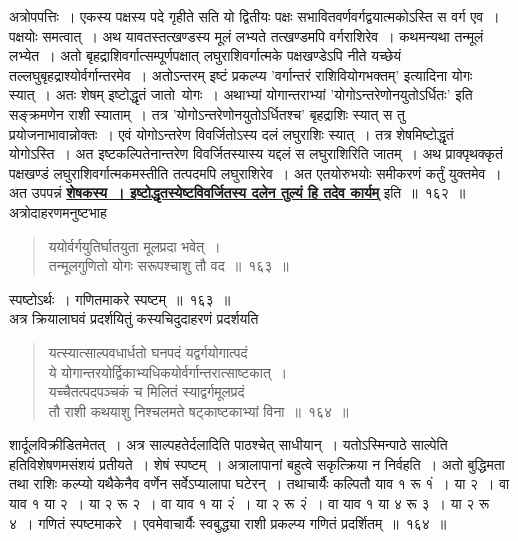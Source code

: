 \documentclass[11pt, openany]{book}
\begin{document}
 अत्रोपपत्तिः~। एकस्य पक्षस्य पदे गृहीते सति यो द्वितीयः पक्षः
सभावितवर्णवर्गद्वयात्मकोऽस्ति स वर्ग एव~। पक्षयोः समत्वात्~। अथ
यावतस्तत्खण्डस्य मूलं लभ्यते तत्खण्डमपि वर्गराशिरेव~। कथमन्यथा तन्मूलं लभ्येत~। अतो बृहद्राशिवर्गात्सम्पूर्णपक्षात् लघुराशिवर्गात्मके पक्षखण्डेऽपि नीते
यच्छेयं तल्लघुबृहद्राश्योर्वर्गान्तरमेव~। अतोऽन्तरम् इष्टं प्रकल्प्य {\qt 'वर्गान्तरं राशिवियोगभक्तम्'} इत्यादिना योगः स्यात्~। अतः शेषम् इष्टोद्धृतं जातो~योगः~। अथाभ्यां योगान्तराभ्यां {\qt 'योगोऽन्तरेणोनयुतोऽर्धितः'} इति सङ्क्रमणेन राशी स्याताम्~। तत्र {\qt 'योगोऽन्तरेणोनयुतोऽर्धितश्च'} बृहद्राशिः स्यात् स तु प्रयोजनाभावान्नोक्तः~।
एवं योगोऽन्तरेण विवर्जितोऽस्य दलं लघुराशिः स्यात्~। तत्र
शेषमिष्टोद्धृतं योगोऽस्ति~। अत इष्टकल्पितेनान्तरेण विवर्जितस्यास्य
यद्दलं स
लघुराशिरिति जातम्~। अथ प्राक्पृथक्कृतं पक्षखण्डं
लघुराशिवर्गात्मकमस्तीति
तत्पदमपि लघुराशिरेव~। अत एतयोरुभयोः समीकरणं कर्तुं युक्तमेव~। अत उपपन्नं
\hyperref[162]{\textbf{शेषकस्य~। इष्टोद्धृतस्येष्टविवर्जितस्य दलेन तुल्यं हि तदेव कार्यम्}} इति~॥~१६२~॥\\

\vspace{-2mm}
 अत्रोदाहरणमनुष्टभाह\textendash
\begin{quote}
    \eg 
     ययोर्वर्गयुतिर्घातयुता मूलप्रदा भवेत्~।\\
 तन्मूलगुणितो योगः सरूपश्चाशु तौ वद~॥~१६३~॥

\end{quote}
\newpage
स्पष्टोऽर्थः~। गणितमाकरे स्पष्टम्~॥~१६३~॥\\

\vspace{-2mm}
 अत्र क्रियालाघवं प्रदर्शयितुं कस्यचिदुदाहरणं प्रदर्शयति\textendash
\begin{quote}
    \eg
      यत्स्यात्साल्पवधार्धतो घनपदं यद्वर्गयोगात्पदं\\
 ये योगान्तरयोर्द्विकाभ्यधिकयोर्वर्गान्तरात्साष्टकात्~। \\
 यच्चैतत्पदपञ्चकं च मिलितं स्याद्वर्गमूलप्रदं\\
 तौ राशी कथयाशु निश्चलमते षट्काष्टकाभ्यां विना~॥~१६४~॥
\end{quote}

 शार्दूलविक्रीडितमेतत्~। अत्र साल्पहतेर्दलादिति पाठश्चेत् साधीयान्~।
यतोऽस्मिन्पाठे साल्पेति हतिविशेषणमसंशयं प्रतीयते~। शेषं स्पष्टम्~।
अत्रालापानां बहुत्वे
सकृत्क्रिया न निर्वहति~। अतो बुद्धिमता तथा राशिः कल्प्यो यथैकेनैव वर्णेन
सर्वेऽप्यालापा घटेरन्~। तथाचार्यैः कल्पितौ याव १ रू १ं~। या २~। वा याव १
या २~। या २ रू २~। वा याव १ या २ं~। या २ रू २ं~। वा याव १ या ४
रू ३~। या २ रू ४~। गणितं स्पष्टमाकरे~। एवमेवाचार्यैः स्वबुद्ध्या राशी
प्रकल्प्य गणितं प्रदर्शितम्~॥~१६४~॥\\
\end{document}
